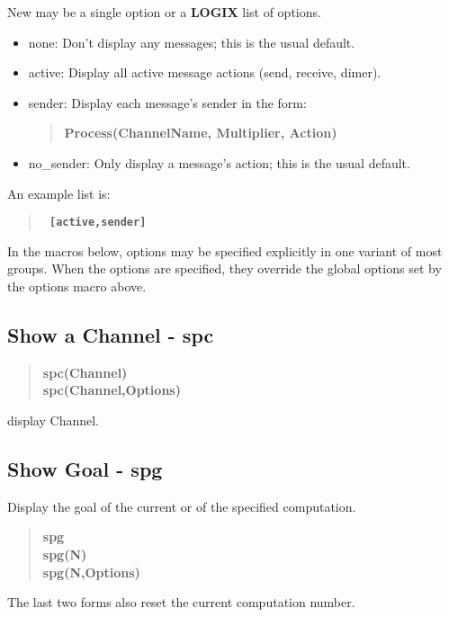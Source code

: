 \documentclass[twoside,10pt]{report}
\begin{document}
\noindent
New  may be a single option or a {\bf LOGIX} list of options.

\begin{itemize}
\item none:     Don't display any messages; this is the usual default.
\item active:   Display all active message actions (send, receive, dimer).
\item sender:   Display each message's sender in the form:
\begin{verse}
 {\bfseries
Process(ChannelName, Multiplier, Action)
 }
\end{verse}
\item no\_sender: Only display a message's action; this is the usual default.
\end{itemize}

\noindent
An example list is:

\begin{verse}
 {\bfseries
    \verb+ [active,sender] +
 }
\end{verse}

\noindent
In the macros below, options may be specified explicitly in one variant
of most groups.  When the options are specified, they override the
global options set by the options macro above.

\subsection{Show a Channel - spc}

\begin{verse}
 {\bfseries
    spc(Channel) \\
    spc(Channel,Options)
 }
\end{verse}

\noindent
display Channel.

\subsection{Show Goal - spg}

Display the goal of the current or of the specified computation.

\begin{verse}
 {\bfseries
   spg \\
   spg(N) \\
   spg(N,Options)
 }
\end{verse}

\noindent
The last two forms also reset the current computation number.
\end{document}
